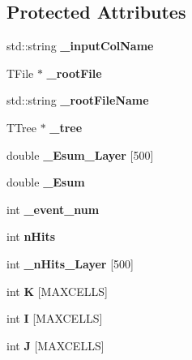 \subsection*{Protected Attributes}
\begin{DoxyCompactItemize}
\item 
std\-::string {\bfseries \-\_\-input\-Col\-Name}\label{classCALICE_1_1RootTreeGenerator2_a6d97d1cb478d4b9f9ad07d9f931d85c3}

\item 
T\-File $\ast$ {\bfseries \-\_\-root\-File}\label{classCALICE_1_1RootTreeGenerator2_a08632a2ad60e68621fcb6057e30a4eac}

\item 
std\-::string {\bfseries \-\_\-root\-File\-Name}\label{classCALICE_1_1RootTreeGenerator2_ab7abbc742f5582e197cef4f90d7eb36b}

\item 
T\-Tree $\ast$ {\bfseries \-\_\-tree}\label{classCALICE_1_1RootTreeGenerator2_aa67a509d3dab33a262220f7a75142b24}

\item 
double {\bfseries \-\_\-\-Esum\-\_\-\-Layer} [500]\label{classCALICE_1_1RootTreeGenerator2_aedb545467debf9bbe2d804c563cc801c}

\item 
double {\bfseries \-\_\-\-Esum}\label{classCALICE_1_1RootTreeGenerator2_a1ca6108c11d35a075c8e4b5c73ec47a6}

\item 
int {\bfseries \-\_\-event\-\_\-num}\label{classCALICE_1_1RootTreeGenerator2_a4e67941217c6c2c47667ab4e8704205e}

\item 
int {\bfseries n\-Hits}\label{classCALICE_1_1RootTreeGenerator2_afa5acbbee145772c75b2827d22a65215}

\item 
int {\bfseries \-\_\-n\-Hits\-\_\-\-Layer} [500]\label{classCALICE_1_1RootTreeGenerator2_aba262ed115b31d6232e74d4e0cf1ab11}

\item 
int {\bfseries K} [M\-A\-X\-C\-E\-L\-L\-S]\label{classCALICE_1_1RootTreeGenerator2_a342a74fb9c58d7979f235fdfa397810b}

\item 
int {\bfseries I} [M\-A\-X\-C\-E\-L\-L\-S]\label{classCALICE_1_1RootTreeGenerator2_adf394c456c8c971690e5527cbb28b489}

\item 
int {\bfseries J} [M\-A\-X\-C\-E\-L\-L\-S]\label{classCALICE_1_1RootTreeGenerator2_a8ae43ce288d7ca3c0ba9ec24ce1c7423}


\end{DoxyCompactItemize}

